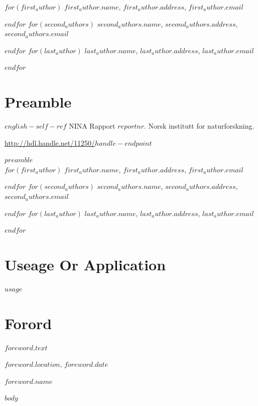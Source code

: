 \documentclass[11pt, a4paper]{article}
\renewcommand*{\href}[2]{\hyperref[#1]{\color{darkblue}\setulcolor{darkblue}\ul{\mbox{#2}}}}
\begin{document}
\vspace{1cm}
\small
$for(first_author)$
$first_author.name$, $first_author.address$, $first_author.email$  \par
$endfor$
$for(second_authors)$
$second_authors.name$, $second_authors.address$, $second_authors.email$  \par
$endfor$
$for(last_author)$
$last_author.name$, $last_author.address$, $last_author.email$  \par
$endfor$
\normalsize
\clearpage

\setcounter{secnumdepth}{0}
\section{Preamble}
\small{$english-self-ref$} NINA Rapport $reportnr$. Norsk institutt for naturforskning. \par\href{http://hdl.handle.net/11250/$handle-endpoint$}{http://hdl.handle.net/11250/$handle-endpoint$}\par
\vspace{0.5cm}
\normalsize{
$preamble$} \\

\vspace{1cm}
\small
$for(first_author)$
$first_author.name$, $first_author.address$, $first_author.email$  \par
$endfor$
$for(second_authors)$
$second_authors.name$, $second_authors.address$, $second_authors.email$  \par
$endfor$
$for(last_author)$
$last_author.name$, $last_author.address$, $last_author.email$  \par
$endfor$
\normalsize
\clearpage

\setcounter{secnumdepth}{0}
\section{Useage Or Application}
\normalsize{
$usage$} \\
\normalsize
\clearpage


\doublespacing
\tableofcontents
{}
\singlespacing
\clearpage

\section{Forord}

\normalsize
$foreword.text$\par
\medskip
$foreword.location$, $foreword.date$\par
\medskip
$foreword.name$



\clearpage
\setcounter{secnumdepth}{4}
\setlength{\parskip}{6pt}

$body$


\end{document}
